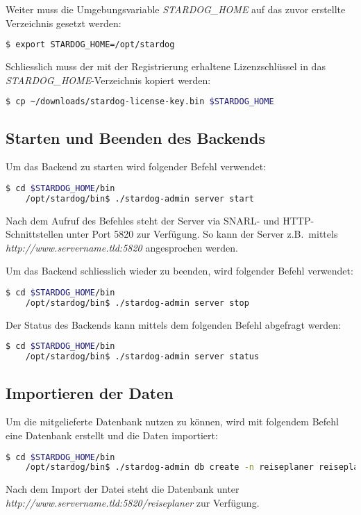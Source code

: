 Weiter muss die Umgebungsvariable \textit{STARDOG\_HOME} auf das zuvor erstellte Verzeichnis gesetzt werden:
\begin{lstlisting}[language=bash]
    $ export STARDOG_HOME=/opt/stardog
\end{lstlisting}

Schliesslich muss der mit der Registrierung erhaltene Lizenzschlüssel in das \textit{STARDOG\_HOME}-Verzeichnis kopiert werden:
\begin{lstlisting}[language=bash]
    $ cp ~/downloads/stardog-license-key.bin $STARDOG_HOME
\end{lstlisting}

\subsection{Starten und Beenden des Backends}
\label{chap:anh:ihb:backend:start}
Um das Backend zu starten wird folgender Befehl verwendet:
\begin{lstlisting}[language=bash]
                    $ cd $STARDOG_HOME/bin
    /opt/stardog/bin$ ./stardog-admin server start
\end{lstlisting}
Nach dem Aufruf des Befehles steht der Server via SNARL- und HTTP-Schnittstellen unter Port 5820 zur Verfügung. So kann der Server z.B.\ mittels \textit{http://www.servername.tld:5820} angesprochen werden.

Um das Backend schliesslich wieder zu beenden, wird folgender Befehl verwendet:
\begin{lstlisting}[language=bash]
                    $ cd $STARDOG_HOME/bin
    /opt/stardog/bin$ ./stardog-admin server stop
\end{lstlisting}

Der Status des Backends kann mittels dem folgenden Befehl abgefragt werden:
\begin{lstlisting}[language=bash]
                    $ cd $STARDOG_HOME/bin
    /opt/stardog/bin$ ./stardog-admin server status
\end{lstlisting}

\subsection{Importieren der Daten}
\label{chap:anh:ihb:backend:import}
Um die mitgelieferte Datenbank nutzen zu können, wird mit folgendem Befehl eine Datenbank erstellt und die Daten importiert:
\begin{lstlisting}[language=bash]
                    $ cd $STARDOG_HOME/bin
    /opt/stardog/bin$ ./stardog-admin db create -n reiseplaner reiseplaner.owl
\end{lstlisting}
Nach dem Import der Datei steht die Datenbank unter \textit{http://www.servername.tld:5820/reiseplaner} zur Verfügung.

